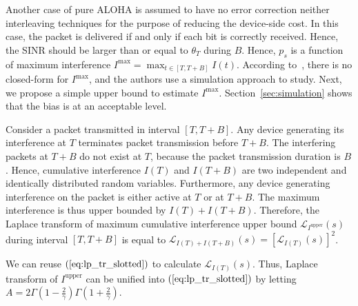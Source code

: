 Another case of pure ALOHA is assumed to have no error correction neither interleaving techniques for the purpose of reducing the device-side cost. In this case, the packet is delivered if and only if each bit is correctly received. Hence, the SINR should be larger than or equal to $\theta_{T}$ during $B$. Hence, $p_{s}$ is a function of maximum interference $I^{\text{max}} = \max_{t \in \left[ T, T+B\right]} I(t)$. According to~\cite[Sec.2.4]{blaszczyszyn2015interference}, there is no closed-form for $I^{\text{max}} $, and the authors use a simulation approach to study. Next, we propose a simple upper bound to estimate $I^{\text{max}}$. Section~\ref{sec:simulation} shows that the bias is at an acceptable level.

Consider a packet transmitted in interval $\left[ T, T+B\right]$. Any device generating its interference at $T$ terminates packet transmission before $T+B$. The interfering packets at $T+B$ do not exist at $T$, because the packet transmission duration is $B$. 
Hence, cumulative interference $I(T)$ and $I(T+B)$ are two independent and identically distributed random variables. Furthermore, any device generating interference on the packet is either active at $T$  or at $T+B$. The maximum interference is thus upper bounded by $I(T)+I(T+B)$. Therefore, the Laplace transform of maximum cumulative interference upper bound $\mathcal{L}_{I^{\text{upper}}}\left( s \right)$ during interval $\left[ T, T+B\right]$ is equal to $ \mathcal{L}_{I(T)+I(T+B)}\left( s\right)= \left[ \mathcal{L}_{I(T)}\left( s\right) \right]^2$. 

We can reuse $(\ref{eq:lp_tr_slotted})$ to calculate $\mathcal{L}_{I(T)}\left( s\right)$. Thus, Laplace transform of $I^{\text{upper}}$ can be unified into $(\ref{eq:lp_tr_slotted})$ by letting $A=2 \Gamma(1-\frac{2}{\gamma}) \Gamma(1+\frac{2}{\gamma})$. 

